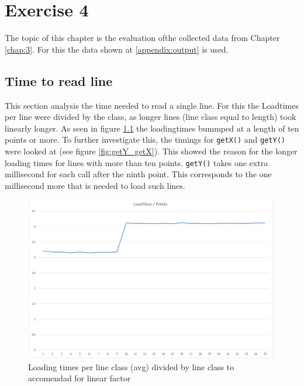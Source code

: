 \chapter{Exercise 4}
\label{chap:4}
The topic of this chapter is the evaluation ofthe collected data from Chapter \ref{chap:3}. For this the data shown at \ref{appendix:output} is used.

\section{Time to read line}
This section analysis the time needed to read a single line. For this the Loadtimes per line were divided by the class, as longer lines (line class equal to length) took linearly longer. As seen in figure \ref{fig:load_class_point} the loadingtimes bummped at a length of ten points or more. To further investigate this, the timings for \texttt{getX()} and \texttt{getY()} were looked at (see figure \ref{fig:getY_getX}). This showed the reason for the longer loading times for lines with more than ten points. \texttt{getY()} takes one extra millisecond for each call after the ninth point. This corresponds to the one millisecond more that is needed to load such lines.

\begin{figure}[h!]
    \begin{center}
        \includegraphics[width=0.99\textwidth]{img/loadingtime_class_point_avg.png}
        \caption{Loading times per line class (avg) divided by line class to accomendad for linear factor}
        \label{fig:load_class_point}
    \end{center}
\end{figure}

